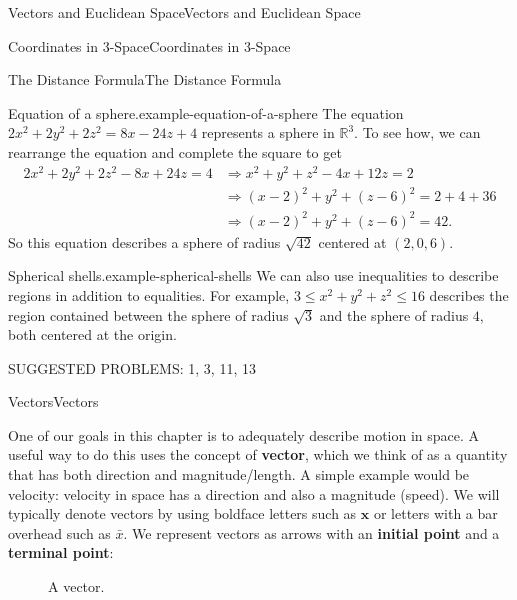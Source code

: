 \documentclass[10pt,]{book}
\newcommand{\terminology}[1]{\textbf{#1}}
\numberwithin{equation}{section}
\newcommand{\RR}{\mathbb{R}}
\newcommand{\vv}[1]{\mathbf{#1}}
\begin{document}
\begin{chapterptx}{Vectors and Euclidean Space}{}{Vectors and Euclidean Space}{}{}
\begin{sectionptx}{Coordinates in 3-Space}{}{Coordinates in 3-Space}{}{}
\begin{subsectionptx}{The Distance Formula}{}{The Distance Formula}{}{}
\begin{example}{Equation of a sphere.}{example-equation-of-a-sphere}
\hypertarget{p-861}{}%
The equation \(2x^{2}+2y^{2}+2z^{2} = 8x - 24z + 4\) represents a sphere in \(\RR^{3}\). To see how, we can rearrange the equation and complete the square to get%
%
\begin{align*}
2x^{2}+2y^{2}+2z^{2} - 8x + 24z = 4 & \Rightarrow x^{2}+y^{2}+z^{2} - 4x + 12z = 2 \\
& \Rightarrow (x-2)^{2} + y^{2} + (z-6)^{2} = 2 + 4 + 36\\
& \Rightarrow (x-2)^{2} + y^{2} + (z-6)^{2} = 42.
\end{align*}
\hypertarget{p-862}{}%
So this equation describes a sphere of radius \(\sqrt{42}\) centered at \((2,0,6)\).%
\end{example}
\begin{example}{Spherical shells.}{example-spherical-shells}%
\hypertarget{p-863}{}%
We can also use inequalities to describe regions in addition to equalities. For example, \(3\leq x^{2}+y^{2}+z^{2}\leq 16\) describes the region contained between the sphere of radius \(\sqrt{3}\) and the sphere of radius \(4\), both centered at the origin.%
\end{example}
\hypertarget{p-864}{}%
SUGGESTED PROBLEMS: 1, 3, 11, 13%
\end{subsectionptx}
\end{sectionptx}
%
%
\typeout{************************************************}
\typeout{************************************************}
%
\begin{sectionptx}{Vectors}{}{Vectors}{}{}\label{section-vectors}
\begin{introduction}{}%
\hypertarget{p-865}{}%
One of our goals in this chapter is to adequately describe motion in space. A useful way to do this uses the concept of \terminology{vector}, which we think of as a quantity that has both direction and magnitude/length. A simple example would be velocity: velocity in space has a direction and also a magnitude (speed). We will typically denote vectors by using boldface letters such as \(\vv{x}\) or letters with a bar overhead such as \(\bar{x}\). We represent vectors as arrows with an \terminology{initial point} and a \terminology{terminal point}:%
\begin{figure}
\centering
{
}
\caption{A vector.\label{figure-vector-representation}}
\end{figure}

\end{introduction}
\end{sectionptx}
\end{chapterptx}
\end{document}
